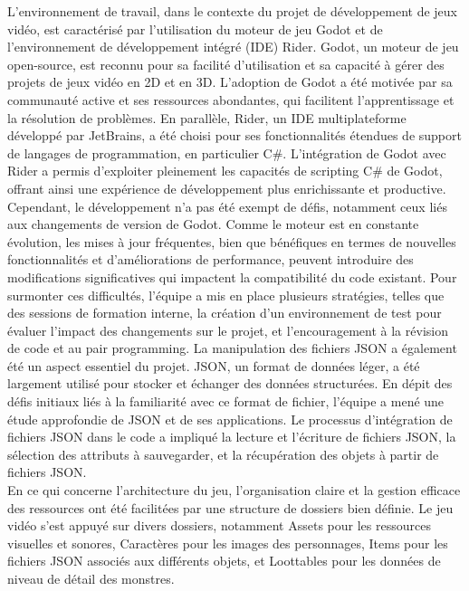 L'environnement de travail, dans le contexte du projet de développement de jeux vidéo, est caractérisé par l'utilisation du moteur de jeu Godot et de l'environnement de
 développement intégré (IDE) Rider. Godot, un moteur de jeu open-source, est reconnu pour sa facilité d'utilisation et sa capacité à gérer des projets de jeux vidéo en 2D et 
 en 3D. L'adoption de Godot a été motivée par sa communauté active et ses ressources abondantes, qui facilitent l'apprentissage et la résolution de problèmes. En parallèle,
  Rider, un IDE multiplateforme développé par JetBrains, a été choisi pour ses fonctionnalités étendues de support de langages de programmation, en particulier C\#.
   L'intégration de Godot avec Rider a permis d'exploiter pleinement les capacités de scripting C\# de Godot, offrant ainsi une expérience de développement plus 
   enrichissante et productive.
   \\

Cependant, le développement n'a pas été exempt de défis, notamment ceux liés aux changements de version de Godot. Comme le moteur est en constante évolution, 
les mises à jour fréquentes, bien que bénéfiques en termes de nouvelles fonctionnalités et d'améliorations de performance, peuvent introduire des modifications 
significatives qui impactent la compatibilité du code existant. Pour surmonter ces difficultés, l'équipe a mis en place plusieurs stratégies, telles que des sessions de
 formation interne, la création d'un environnement de test pour évaluer l'impact des changements sur le projet, et l'encouragement à la révision de code et au pair programming.
La manipulation des fichiers JSON a également été un aspect essentiel du projet. JSON, un format de données léger, a été largement utilisé pour stocker et échanger 
des données structurées. En dépit des défis initiaux liés à la familiarité avec ce format de fichier, l'équipe a mené une étude approfondie de JSON et de ses applications. 
Le processus d'intégration de fichiers JSON dans le code a impliqué la lecture et l'écriture de fichiers JSON, la sélection des attributs à sauvegarder, et la récupération 
des objets à partir de fichiers JSON.
\\

En ce qui concerne l'architecture du jeu, l'organisation claire et la gestion efficace des ressources ont été facilitées par une structure de dossiers bien définie. 
Le jeu vidéo s'est appuyé sur divers dossiers, notamment Assets pour les ressources visuelles et sonores, Caractères pour les images des personnages, 
Items pour les fichiers JSON associés aux différents objets, et Loottables pour les données de niveau de détail des monstres.
\\

